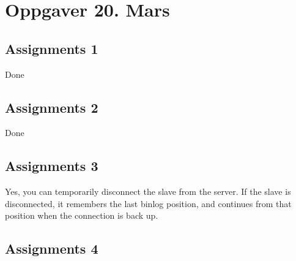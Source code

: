\section{Oppgaver 20. Mars}

\subsection{Assignments 1} 
Done

\subsection{Assignments 2} 
Done

\subsection{Assignments 3} 
Yes, you can temporarily disconnect the slave from the server. If the slave is disconnected, it remembers the last binlog position, and continues from that position when the connection is back up.

\subsection{Assignments 4} 

